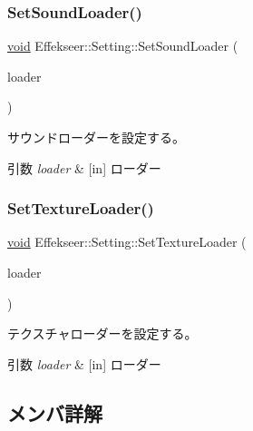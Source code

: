 \subsubsection{\texorpdfstring{Set\+Sound\+Loader()}{SetSoundLoader()}}
{\footnotesize\ttfamily \mbox{\hyperlink{namespace_effekseer_ab34c4088e512200cf4c2716f168deb56}{void}} Effekseer\+::\+Setting\+::\+Set\+Sound\+Loader (\begin{DoxyParamCaption}\item[{\mbox{\hyperlink{class_effekseer_1_1_sound_loader}{Sound\+Loader}} $\ast$}]{loader }\end{DoxyParamCaption})}



サウンドローダーを設定する。 


\begin{DoxyParams}{引数}
{\em loader} & \mbox{[}in\mbox{]} ローダー \\
\hline
\end{DoxyParams}
\mbox{\label{class_effekseer_1_1_setting_a0475d684fcef475fae8250d8b43a5ffc}} 
\subsubsection{\texorpdfstring{Set\+Texture\+Loader()}{SetTextureLoader()}}
{\footnotesize\ttfamily \mbox{\hyperlink{namespace_effekseer_ab34c4088e512200cf4c2716f168deb56}{void}} Effekseer\+::\+Setting\+::\+Set\+Texture\+Loader (\begin{DoxyParamCaption}\item[{\mbox{\hyperlink{class_effekseer_1_1_texture_loader}{Texture\+Loader}} $\ast$}]{loader }\end{DoxyParamCaption})}



テクスチャローダーを設定する。 


\begin{DoxyParams}{引数}
{\em loader} & \mbox{[}in\mbox{]} ローダー \\
\hline
\end{DoxyParams}


\subsection{メンバ詳解}
\mbox{\label{class_effekseer_1_1_setting_af37739356b4116d84dd38d2aba817836}} 
